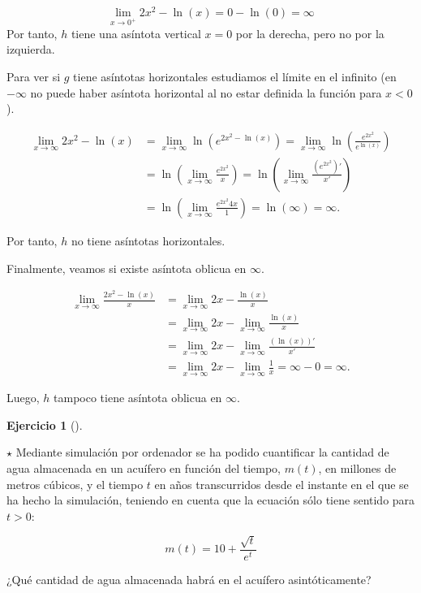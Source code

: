 \documentclass[
  spanish,
  a4paper,
]{scrreport}
\theoremstyle{definition}
\newtheorem{exercise}{Ejercicio}[chapter]
\theoremstyle{remark}
\begin{document}
\begin{tcolorbox}
\begin{enumerate}
  \[
   \lim_{x\to 0^+} 2x^2-\ln(x) = 0-\ln(0) = \infty
   \] Por tanto, \(h\) tiene una asíntota vertical \(x=0\) por la
  derecha, pero no por la izquierda.

  Para ver si \(g\) tiene asíntotas horizontales estudiamos el límite en
  el infinito (en \(-\infty\) no puede haber asíntota horizontal al no
  estar definida la función para \(x<0\)).

  \begin{align*}
   \lim_{x\to\infty} 2x^2-\ln(x) &= \lim_{x\to\infty}\ln(e^{2x^2-\ln(x)}) = \lim_{x\to \infty} \ln\left(\frac{e^{2x^2}}{e^{\ln(x)}}\right)\\ 
   &= \ln\left(\lim_{x\to \infty} \frac{e^{2x^2}}{x}\right) = \ln\left(\lim_{x\to \infty} \frac{(e^{2x^2})'}{x'}\right) \tag{L'Hôpital} \\ 
   &= \ln\left(\lim_{x\to \infty} \frac{e^{2x^2}4x}{1}\right) = \ln(\infty) = \infty.
   \end{align*}

  Por tanto, \(h\) no tiene asíntotas horizontales.

  Finalmente, veamos si existe asíntota oblicua en \(\infty\).

  \begin{align*}
   \lim_{x\to\infty} \frac{2x^2-\ln(x)}{x} &= \lim_{x\to \infty} 2x - \frac{\ln(x)}{x}\\ 
   & = \lim_{x\to \infty} 2x -\lim_{x\to \infty}\frac{\ln(x)}{x}\\ 
   &= \lim_{x\to \infty} 2x -\lim_{x\to \infty}\frac{(\ln(x))'}{x'} \tag{L'Hôpital}\\ 
   & = \lim_{x\to \infty} 2x -\lim_{x\to \infty}\frac{1}{x}= \infty-0=\infty.  
   \end{align*}

  Luego, \(h\) tampoco tiene asíntota oblicua en \(\infty\).
\end{enumerate}

\end{tcolorbox}

\begin{exercise}[]\protect\hypertarget{exr-acuifero}{}\label{exr-acuifero}

\(\star\) Mediante simulación por ordenador se ha podido cuantificar la
cantidad de agua almacenada en un acuífero en función del tiempo,
\(m(t)\), en millones de metros cúbicos, y el tiempo \(t\) en años
transcurridos desde el instante en el que se ha hecho la simulación,
teniendo en cuenta que la ecuación sólo tiene sentido para \(t>0\):

\[
m(t) = 10 + \frac{\sqrt{t}}{e^t}
\]

¿Qué cantidad de agua almacenada habrá en el acuífero asintóticamente?

\end{exercise}
\end{document}
